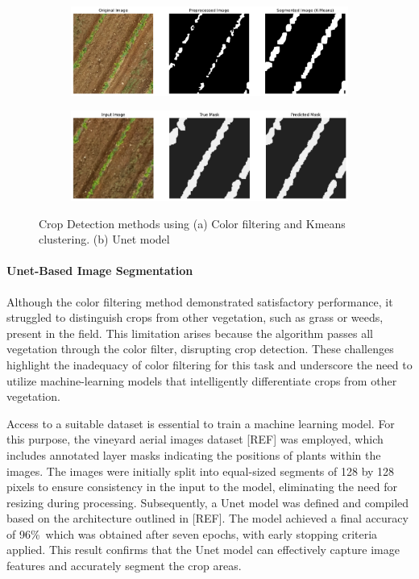 \documentclass[conference]{IEEEtran}
\begin{document}
\begin{figure}[htbp]
    \centering
    \begin{subfigure}[b]{0.45\textwidth}
        \centering
        \includegraphics[width=\linewidth]{Kmeans.png}
        \caption{}
        \label{fig2:kmeans}
    \end{subfigure}\hfill
    \begin{subfigure}[b]{0.45\textwidth}
        \centering
        \includegraphics[width=\linewidth]{Dryoutputgrass.png}
        \caption{}
        \label{fig2:filtering}
    \end{subfigure}
    \caption{Crop Detection methods using (a) Color filtering and Kmeans clustering. (b) Unet model}
    \label{fig2:combined}
\end{figure}

\paragraph{Unet-Based Image Segmentation}
Although the color filtering method demonstrated satisfactory performance, it struggled to distinguish crops from other vegetation, such as grass or weeds, present in the field. This limitation arises because the algorithm passes all vegetation through the color filter, disrupting crop detection. These challenges highlight the inadequacy of color filtering for this task and underscore the need to utilize machine-learning models that intelligently differentiate crops from other vegetation.

Access to a suitable dataset is essential to train a machine learning model. For this purpose, the vineyard aerial images dataset [REF] was employed, which includes annotated layer masks indicating the positions of plants within the images. The images were initially split into equal-sized segments of 128 by 128 pixels to ensure consistency in the input to the model, eliminating the need for resizing during processing. Subsequently, a Unet model was defined and compiled based on the architecture outlined in [REF]. The model achieved a final accuracy of 96\%\, which was obtained after seven epochs, with early stopping criteria applied. This result confirms that the Unet model can effectively capture image features and accurately segment the crop areas.
\end{document}
